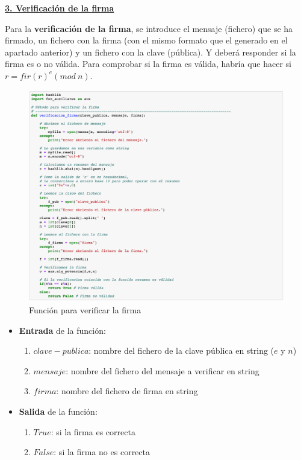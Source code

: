 \documentclass{manual}
\begin{document}
\underline{\textbf{3. Verificación de la firma}}

Para la \textbf{verificación de la firma}, se introduce el mensaje (fichero) que se ha firmado, un fichero con la firma (con el mismo formato que el generado en el apartado anterior) y un fichero con la clave (pública). Y deberá responder si la firma es o no válida. Para comprobar si la firma es válida, habría que hacer si $r = fir(r)^e (mod\ n)$.

\begin{figure}[H]
	\centering
	\includegraphics[width=145mm]{images/3}
	\caption{Función para verificar la firma} 
\end{figure}

\begin{itemize}
	\item \textbf{Entrada} de la función: 
		\begin{enumerate}
			\item $clave-publica$: nombre del fichero de la clave pública en string ($e$ y $n$)
			\item $mensaje$: nombre del fichero del mensaje a verificar en string
			\item $firma$: nombre del fichero de firma en string
		\end{enumerate}	
	
	\item \textbf{Salida} de la función: 
		\begin{enumerate}
			\item $True$: si la firma es correcta
			\item $False$: si la firma no es correcta
 		\end{enumerate}	
\end{itemize}				
\end{document}
